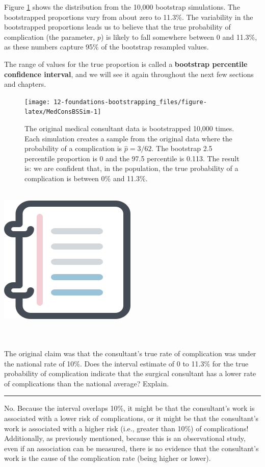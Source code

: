 \documentclass[
  10pt,
  openany]{book}
\newenvironment{mdframedwithfootGPWE}
{   
    \savenotes
    \begin{mdframed}[%
    topline=true, bottomline=true, linecolor=oiB, linewidth=0.5pt,
    rightline=false, leftline=false,
    backgroundcolor=oiLGray]
    \renewcommand{\thempfootnote}{\arabic{footnote}}
    }
{
    \end{mdframed}
    \spewnotes
}
\newenvironment{workedexample}{
    \let\oldrule\rule
    \renewcommand{\rule}[2]{\vspace{-2mm}\oldrule{##1}{##2}\vspace{-2mm}}
\vspace{4mm}
\begin{mdframedwithfootGPWE}
\begin{minipage}[t]{0.10\textwidth}
{$\:$ \\ \setkeys{Gin}{width=2.5em,keepaspectratio}\includegraphics{images/_icons/worked-example.png}}
\end{minipage}
\hfill
\begin{minipage}[t]{0.90\textwidth}
\vspace{-2mm}
\setlength{\parskip}{1em}
\noindent\textbf{\color{oiB}\small\fontfamily{phv}\selectfont{\MakeUppercase{Example}}} $\:$ \\ \\
}{\end{minipage}
\end{mdframedwithfootGPWE}
\vspace{4mm}
}
\begin{document}
Figure \ref{fig:MedConsBSSim} shows the distribution from the 10,000 bootstrap simulations.
The bootstrapped proportions vary from about zero to 11.3\%.
The variability in the bootstrapped proportions leads us to believe that the true probability of complication (the parameter, \(p\)) is likely to fall somewhere between 0 and 11.3\%, as these numbers capture 95\% of the bootstrap resampled values.

The range of values for the true proportion is called a \textbf{bootstrap percentile confidence interval}, and we will see it again throughout the next few sections and chapters.

\begin{figure}[h]

{\centering \texttt{[image: 12-foundations-bootstrapping\_files/figure-latex/MedConsBSSim-1]} 

}

\caption{The original medical consultant data is bootstrapped 10,000 times. Each simulation creates a sample from the original data where the probability of a complication is \(\hat{p} = 3/62.\) The bootstrap 2.5 percentile proportion is 0 and the 97.5 percentile is 0.113. The result is: we are confident that, in the population, the true probability of a complication is between 0\% and 11.3\%.}\label{fig:MedConsBSSim}
\end{figure}



\begin{workedexample}
The original claim was that the consultant's true rate of complication was under the national rate of 10\%.
Does the interval estimate of 0 to 11.3\% for the true probability of complication indicate that the surgical consultant has a lower rate of complications than the national average?
Explain.

\begin{center}\rule{0.5\linewidth}{0.5pt}\end{center}

No.
Because the interval overlaps 10\%, it might be that the consultant's work is associated with a lower risk of complications, or it might be that the consultant's work is associated with a higher risk (i.e., greater than 10\%) of complications!
Additionally, as previously mentioned, because this is an observational study, even if an association can be measured, there is no evidence that the consultant's work is the cause of the complication rate (being higher or lower).

\end{workedexample}
\end{document}
